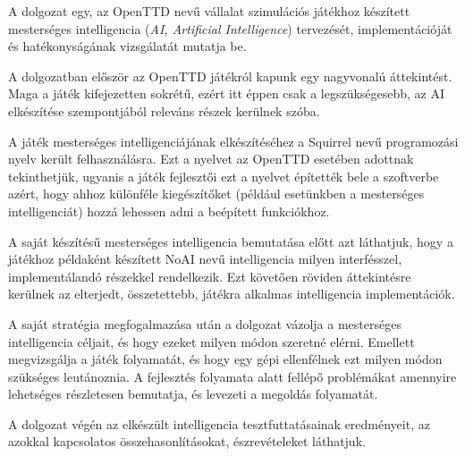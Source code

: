 
A dolgozat egy, az OpenTTD nevű vállalat szimulációs játékhoz készített mesterséges intelligencia (\textit{AI, Artificial Intelligence}) tervezését, implementációját és hatékonyságának vizsgálatát mutatja be.

A dolgozatban először az OpenTTD játékról kapunk egy nagyvonalú áttekintést. Maga a játék kifejezetten sokrétű, ezért itt éppen csak a legszükségesebb, az AI elkészítése szempontjából releváns részek kerülnek szóba.

A játék mesterséges intelligenciájának elkészítéséhez a Squirrel nevű programozási nyelv került felhasználásra. Ezt a nyelvet az OpenTTD esetében adottnak tekinthetjük, ugyanis a játék fejlesztői ezt a nyelvet építették bele a szoftverbe azért, hogy ahhoz különféle kiegészítőket (például esetünkben a mesterséges intelligenciát) hozzá lehessen adni a beépített funkciókhoz.

A saját készítésű mesterséges intelligencia bemutatása előtt azt láthatjuk, hogy a játékhoz példaként készített NoAI nevű intelligencia milyen interfésszel, implementálandó részekkel rendelkezik. Ezt követően röviden áttekintésre kerülnek az elterjedt, összetettebb, játékra alkalmas intelligencia implementációk.

A saját stratégia megfogalmazása után a dolgozat vázolja a mesterséges intelligencia céljait, és hogy ezeket milyen módon szeretné elérni. Emellett megvizsgálja a játék folyamatát, és hogy egy gépi ellenfélnek ezt milyen módon szükséges leutánoznia. A fejlesztés folyamata alatt fellépő problémákat amennyire lehetséges részletesen bemutatja, és levezeti a megoldás folyamatát.

A dolgozat végén az elkészült intelligencia tesztfuttatásainak eredményeit, az azokkal kapcsolatos összehasonlításokat, észrevételeket láthatjuk.
